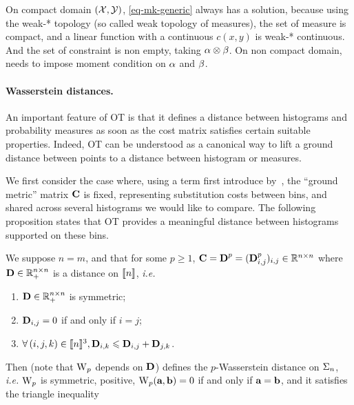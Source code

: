 On compact domain $(\mathcal{X},\mathcal{Y})$, \eqref{eq-mk-generic} always has a solution, because using the weak-* topology (so called weak topology of measures), the set of measure is compact, and a linear function with a continuous $c(x,y)$ is weak-* continuous. And the set of constraint is non empty, taking $\alpha \otimes \beta$. On non compact domain, needs to impose moment condition on $\alpha$ and $\beta$.



\paragraph{Wasserstein distances.}

An important feature of OT is that it defines a distance between histograms and probability measures as soon as the cost matrix satisfies certain suitable properties. Indeed, OT can be understood as a canonical way to lift a ground distance between points to a distance between histogram or measures. 

We first consider the case where, using a term first introduce by~\cite{RubTomGui00}, the ``ground metric'' matrix $\mathrm{\textbf{\upshape C}}$ is fixed, representing substitution costs between bins, and shared across several histograms we would like to compare. The following proposition states that OT provides a meaningful distance between histograms supported on these bins.

\begin{prop}\label{prop-metric-histo}
We suppose $n=m$, and that for some $p \geq 1$, $\mathrm{\textbf{\upshape C}}=\mathrm{\textbf{\upshape D}}^p=(\mathrm{\textbf{\upshape D}}_{i,j}^p)_{i,j} \in \mathbb{R}^{n \times n}$ where $\mathrm{\textbf{\upshape D}} \in \mathbb{R}_+^{n \times n}$ is a distance on $\llbracket n\rrbracket$, \emph{i.e.}
\begin{enumerate}%
	\item $\mathrm{\textbf{\upshape D}} \in \mathbb{R}_+^{n \times n}$ is symmetric; 
	\item $\mathrm{\textbf{\upshape D}}_{i,j}=0$ if and only if $i=j$; 
	\item $\forall \, (i,j,k) \in \llbracket n\rrbracket^3, \mathrm{\textbf{\upshape D}}_{i,k} \leqslant \mathrm{\textbf{\upshape D}}_{i,j}+\mathrm{\textbf{\upshape D}}_{j,k}$.
\end{enumerate}
Then 
(note that $\operatorname{\mathrm{W}}_p$ depends on $\mathrm{\textbf{\upshape D}}$) defines the $p$-Wasserstein distance on $\Sigma_n$, \emph{i.e.} $\operatorname{\mathrm{W}}_p$ is symmetric, positive, $\operatorname{\mathrm{W}}_p(\mathrm{\textbf{\upshape a}},\mathrm{\textbf{\upshape b}})=0$ if and only if $\mathrm{\textbf{\upshape a}} = \mathrm{\textbf{\upshape b}}$, and it satisfies the triangle inequality
\end{prop}

